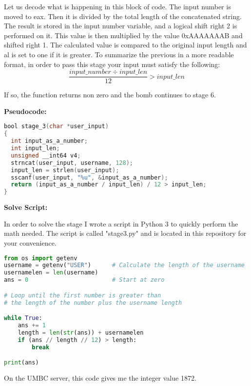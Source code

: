 \documentclass{article}
\begin{document}
Let us decode what is happening in this block of code.  The input number is 
moved to eax.  Then it is divided by the total length of the concatenated
string.  The result is stored in the input number variable, and a logical 
shift right 2 is performed on it.  This value is then multiplied by the value
0xAAAAAAAB and shifted right 1.  The calculated value is compared to the 
original input length and al is set to one if it is greater.  To summarize 
the previous in a more readable format, in order to pass this stage your input
must satisfy the following:
\[ \frac{input\_number\div input\_len}{12} > input\_len\]
\par
If so, the function returns non zero and the bomb continues to stage 6.

\begin{flushleft}
\textbf{Pseudocode:}
\vspace{.5pc}
\end{flushleft}
\begin{lstlisting}[language=C]
bool stage_3(char *user_input)
{
  int input_as_a_number;
  int input_len;
  unsigned __int64 v4;
  strncat(user_input, username, 128);
  input_len = strlen(user_input);
  sscanf(user_input, "%u", &input_as_a_number);
  return (input_as_a_number / input_len) / 12 > input_len;
}
\end{lstlisting}

\begin{flushleft}
\textbf{Solve Script:}
\vspace{.5pc}
\end{flushleft}
\par
In order to solve the stage I wrote a script in Python 3 to quickly perform 
the math needed.  The script is called "stage3.py" and is located in this
repository for your convenience.  

\begin{lstlisting}[language=Python]
from os import getenv
username = getenv("USER")      # Calculate the length of the username
usernamelen = len(username)
ans = 0                        # Start at zero

# Loop until the first number is greater than
# the length of the number plus the username length

while True:
    ans += 1                   
    length = len(str(ans)) + usernamelen   
    if (ans // length // 12) > length:
        break

print(ans)
\end{lstlisting}
\par
On the UMBC server, this code gives me the integer value 1872.
\end{document}
